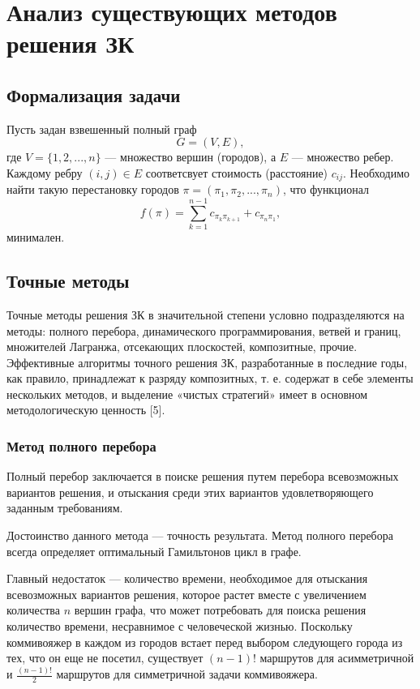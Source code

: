 \chapter{Анализ существующих методов \\решения ЗК}

\section{Формализация задачи}
Пусть задан взвешенный полный граф
\begin{equation}
    \label{eq:graph}
    G = (V, E),
\end{equation}
где $V = \{1, 2, ..., n\}$ --- множество вершин (городов), а $E$ --- множество ребер. Каждому ребру $(i, j) \in E$ соответсвует стоимость (расстояние) $c_{ij}$. Необходимо найти такую перестановку городов $\pi = (\pi_{1}, \pi_{2}, ..., \pi_{n})$, что функционал
\begin{equation}
    \label{eq:func}
    f(\pi) = \sum_{k=1}^{n-1}{c_{\pi_{k}\pi_{k+1}}+c_{\pi_{n}\pi_{1}}},
\end{equation}
минимален.

\section{Точные методы}
Точные методы решения ЗК в значительной степени условно подразделяются на методы: полного перебора, динамического программирования, ветвей и границ, множителей Лагранжа, отсекающих плоскостей, композитные, прочие.
Эффективные алгоритмы точного решения ЗК, разработанные в последние годы, как правило, принадлежат к разряду композитных, т. е. содержат в себе элементы нескольких методов, и выделение «чистых стратегий» имеет в основном методологическую ценность [5].

\subsection{Метод полного перебора}
Полный перебор заключается в поиске решения путем перебора всевозможных вариантов решения, и отыскания среди этих вариантов удовлетворяющего заданным требованиям.

Достоинство данного метода --- точность результата. Метод полного перебора всегда определяет оптимальный Гамильтонов цикл в графе.

Главный недостаток --- количество времени, необходимое для отыскания всевозможных вариантов решения,
которое растет вместе с увеличением количества $n$ вершин графа, что может потребовать для поиска решения количество времени, несравнимое с человеческой жизнью. Поскольку коммивояжер в каждом из городов встает перед выбором следующего города из тех, что он еще не посетил, существует $(n-1)!$ маршрутов для асимметричной и $\frac{(n-1)!}{2}$ маршрутов для симметричной задачи коммивояжера.

